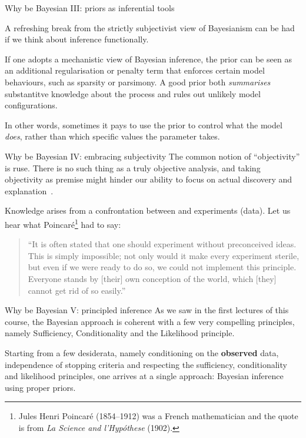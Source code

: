 \begin{frame}{Why be Bayesian III: priors as inferential tools}

A refreshing break from the strictly subjectivist view of Bayesianism can be had if we think about inference functionally. 

 \begin{idea}
 \label{id:prior_tool}
  If one adopts a mechanistic view of Bayesian inference, the prior can be seen as an additional regularisation or penalty term that enforces certain model behaviours, such as sparsity or parsimony.
  A good prior both \textit{summarises} substantitve knowledge about the process and rules out unlikely model configurations.
 \end{idea}

 In other words, sometimes it pays to use the prior to control what the model \textit{does}, rather than which specific values the parameter takes.
 
 \end{frame}
\begin{frame}{Why be Bayesian IV: embracing subjectivity}
The common notion of ``objectivity'' is ruse.
There is no such thing as a truly objective analysis, and taking objectivity as premise might hinder our ability to focus on actual discovery and explanation~\citep{Hennig2017}.
\begin{idea}
\label{id:subjective}
 Knowledge arises from a confrontation between  and experiments (data).
 Let us hear what Poincaré\footnote{Jules Henri Poincaré (1854--1912) was a French mathematician and the quote is from \textit{La Science and l'Hypóthese} (1902).} had to say:
 \begin{quote}
  ``It is often stated that one should experiment without preconceived ideas.
  This is simply impossible; not only would it make every experiment sterile, but even if we were ready to do so, we could not implement this principle. 
  Everyone stands by [their] own conception of the world, which [they] cannot get rid of so easily.''
 \end{quote}
 \end{idea}
\end{frame}
\begin{frame}{Why be Bayesian V: principled inference}
As we saw in the first lectures of this course, the Bayesian approach is coherent with a few very compelling principles, namely Sufficiency, Conditionality and the Likelihood principle.
\begin{idea}
Starting from a few desiderata, namely conditioning on the \textbf{observed} data, independence of stopping criteria and respecting the sufficiency, conditionality and  likelihood principles, one arrives at a single approach: Bayesian inference using proper priors.
 \label{id:principled_inference}
\end{idea}
 \end{frame}
